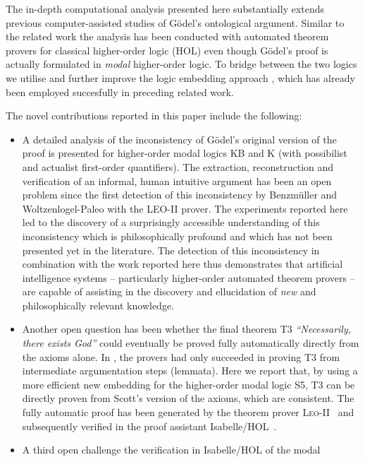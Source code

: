 \documentclass{article}
\begin{document}
The in-depth computational analysis presented here substantially
extends previous computer-assisted studies of G\"odel's ontological
argument. Similar to the related work \cite{J30,C40} the analysis has
been conducted with automated theorem provers for classical
higher-order logic (HOL) even though G\"odel's proof is actually
formulated in \emph{modal} higher-order logic. To bridge between the two
logics we utilise and further improve the logic embedding
approach \cite{J23,C40}, which has already been employed succesfully in preceding related work.


The novel contributions reported in this paper include the following:

\begin{itemize}
\item A detailed analysis of the inconsistency of G\"{o}del's
   original version of the proof is presented
  for higher-order modal logics KB and K (with possibilist and
  actualist first-order quantifiers). The extraction, reconstruction
  and verification of an informal, human intuitive argument has been
  an open problem since the first detection of this inconsistency by
  Benzm\"uller and Woltzenlogel-Paleo  with the LEO-II prover. 
  The experiments reported here led to the discovery of a surprisingly accessible
  understanding of this inconsistency which is philosophically
  profound and which has not been presented yet in the
  literature. The detection of this inconsistency in combination with
  the work reported here thus demonstrates that artificial intelligence systems -- 
  particularly higher-order automated
  theorem provers -- are capable of assisting in the discovery and ellucidation of
  \emph{new} and philosophically relevant knowledge. 
\item Another open question has been whether the final theorem T3 \textit{``Necessarily, there
    exists God''} could eventually be proved fully automatically
  directly from the axioms alone. In , the provers had only succeeded in proving 
  T3 from intermediate argumentation steps (lemmata). Here we report that, by using a more efficient new
  embedding for the higher-order modal logic S5, T3 can be directly proven from Scott's version of the axioms, which are consistent. The fully automatic proof has been
  generated by the theorem prover \textsc{Leo-II}~\cite{C26} and
  subsequently verified in the proof assistant
  Isabelle/HOL~\cite{NPW02}.
\item A third open challenge the verification in Isabelle/HOL of the modal

\end{itemize}
\end{document}
